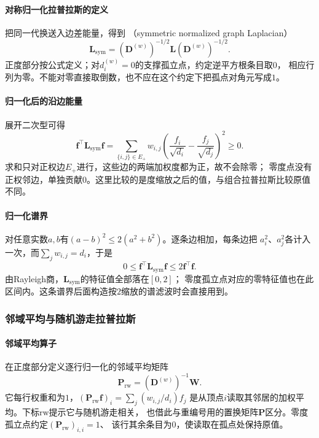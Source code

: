 \paragraph{对称归一化拉普拉斯的定义}
把同一代换送入边差能量，得到
（symmetric normalized graph Laplacian）
\begin{equation}
  \bm L_{\mathrm{sym}}
  =(\bm D^{(w)})^{-1/2}\bm L(\bm D^{(w)})^{-1/2}.
  \label{eq:graph-theory-normalized-laplacian}
\end{equation}
正度部分按公式定义；对$d_i^{(w)}=0$的支撑孤立点，约定逆平方根条目取$0$，
相应行列为零。不能对零直接取倒数，也不应在这个约定下把孤点对角元写成$1$。

\paragraph{归一化后的沿边能量}
展开二次型可得
\[
  \bm f^\top\bm L_{\mathrm{sym}}\bm f
  =\sum_{\{i,j\}\in E_+}w_{i,j}
    \left(\frac{f_i}{\sqrt{d_i}}-\frac{f_j}{\sqrt{d_j}}\right)^2\geq 0.
\]
求和只对正权边$E_+$进行，这些边的两端加权度都为正，故不会除零；
零度点没有正权邻边，单独贡献$0$。这里比较的是度缩放之后的值，与组合拉普拉斯比较原值不同。

\paragraph{归一化谱界}
对任意实数$a,b$有$(a-b)^2\leq 2(a^2+b^2)$。逐条边相加，每条边把
$a_i^2$、$a_j^2$各计入一次，而$\sum_j w_{i,j}=d_i$，于是
\[
  0\leq \bm f^\top\bm L_{\mathrm{sym}}\bm f\leq 2\bm f^\top\bm f.
\]
由Rayleigh商，$\bm L_{\mathrm{sym}}$的特征值全部落在$[0,2]$；
零度孤立点对应的零特征值也在此区间内。这条谱界后面构造按$2$缩放的谱滤波时会直接用到。

\subsubsection{邻域平均与随机游走拉普拉斯}

\paragraph{邻域平均算子}
在正度部分定义逐行归一化的邻域平均矩阵
\[
  \bm P_{\mathrm{rw}}=(\bm D^{(w)})^{-1}\bm W.
\]
它每行权重和为$1$，$(\bm P_{\mathrm{rw}}\bm f)_i=\sum_j(w_{i,j}/d_i)f_j$
是从顶点$i$读取其邻居的加权平均。下标$\mathrm{rw}$提示它与随机游走相关，
也借此与重编号用的置换矩阵$\bm P$区分。零度孤立点约定$(\bm P_{\mathrm{rw}})_{i,i}=1$、
该行其余条目为$0$，使读取在孤点处保持原值。

